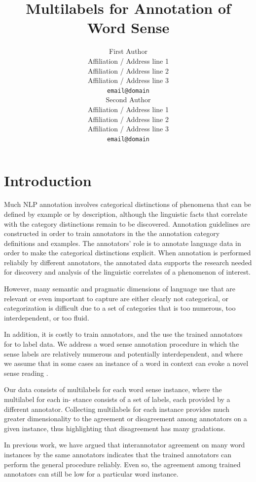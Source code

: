 \documentclass[11pt]{article}
\title{Multilabels for Annotation of Word Sense}
\author{First Author \\
   Affiliation / Address line 1 \\
   Affiliation / Address line 2 \\
   Affiliation / Address line 3 \\
  {\tt email@domain} \\\And
   Second Author \\
   Affiliation / Address line 1 \\
   Affiliation / Address line 2 \\
   Affiliation / Address line 3 \\
   {\tt email@domain} 
\\}
\date{}
\begin{document}
\maketitle
\begin{abstract}

\end{abstract}

\section{Introduction} %

Much NLP annotation involves categorical distinctions of phenomena
that can be defined by example or by description, although the
linguistic facts that correlate with the category distinctions remain
to be discovered. Annotation guidelines are constructed in order to
train annotators in the the annotation category definitions and
examples. The annotators’ role is to annotate language data in order
to make the categorical distinctions explicit. When annotation is
performed reliabily by different annotators, the annotated data
supports the research needed for discovery and analysis of the
linguistic correlates of a phenomenon of interest. 

However, many semantic and pragmatic dimensions of language use that
are relevant or even important to capture are either clearly not
categorical, or categorization is difficult due to a set of categories
that is too numerous, too interdependent, or too fluid. 

In addition, it is costly to train annotators, and the use the trained
annotators for to label data. We address a word sense annotation
procedure in which the sense labels are relatively numerous and
potentially interdependent, and where we assume that in some cases an
instance of a word in context can evoke a novel sense reading
\cite{ludlow2005}.

Our data consists of multilabels for each word sense instance, where
the multilabel for each in- stance consists of a set of labels, each
provided by a different annotator. Collecting multilabels for each
instance provides much greater dimensionality to the agreement or
disagreement among annotators on a given instance, thus highlighting
that disagreement has many gradations.

In previous work, we have argued that interannotator agreement on many
word instances by the same annotators indicates that the trained
annotators can perform the general procedure reliably.  Even so, the
agreement among trained annotators can still be low for a particular
word instance.  
\end{document}

